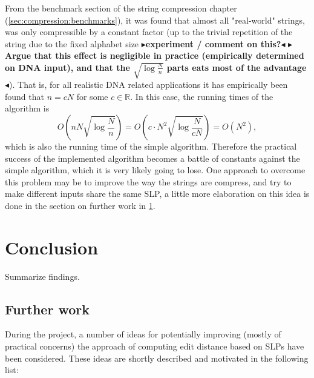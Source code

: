 \documentclass[twoside,11pt,openright]{report}
\newcommand{\todo}[1]{{\color[rgb]{.5,0,0}\textbf{$\blacktriangleright$#1$\blacktriangleleft$}}}
\begin{document}
From the benchmark section of the string compression chapter (\cref{sec:compression:benchmarks}), it was found that almost all "real-world" strings, was only compressible by a constant factor (up to the trivial repetition of the string due to the fixed alphabet size \todo{experiment / comment on this?} \todo{Argue that this effect is negligible in practice (empirically determined on DNA input), and that the $\sqrt{\log{\frac{N}{n}}}$ parts eats most of the advantage}). That is, for all realistic DNA related applications it has empirically been found that $n = cN$ for some $c \in \mathbb{R}$. In this case, the running times of the algorithm is
\[
  O\left( nN\sqrt{\log{\frac{N}{n}}} \right) = O\left( c \cdot N^2 \sqrt{\log{\frac{N}{cN}}} \right) = O(N^2),
\]
which is also the running time of the simple algorithm. Therefore the practical success of the implemented algorithm becomes a battle of constants against the simple algorithm, which it is very likely going to lose. One approach to overcome this problem may be to improve the way the strings are compress, and try to make different inputs share the same SLP, a little more elaboration on this idea is done in the section on further work in \cref{chapter:conclusion}.


\chapter{Conclusion}
\label{chapter:conclusion}
Summarize findings.

\section{Further work}
\label{sec:conclusion:further-work}
During the project, a number of ideas for potentially improving (mostly of practical concerns) the approach of computing edit distance based on SLPs have been considered. These ideas are shortly described and motivated in the following list:
\end{document}
